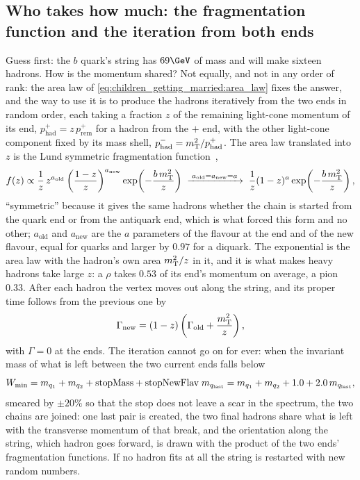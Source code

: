 \subsection{Who takes how much: the fragmentation function and the iteration from both ends}
\label{sec:children_getting_married:fragmentation_function}

Guess first: the $b$ quark's string has $69\GeV$ of mass and will make
sixteen hadrons. How is the momentum shared? Not equally, and not in any
order of rank: the area law of \cref{eq:children_getting_married:area_law}
fixes the answer, and the way to use it is to produce the hadrons
iteratively from the two ends in random order, each taking a fraction $z$
of the remaining light-cone momentum of its end,
$p^+_{\mathrm{had}}=z\,p^+_{\mathrm{rem}}$ for a hadron from the $+$ end,
with the other light-cone component fixed by its mass shell,
$p^-_{\mathrm{had}}=m_{\mathrm{T}}^2/p^+_{\mathrm{had}}$. The area law translated
into $z$ is the Lund symmetric fragmentation
function~\cite{Andersson:1983jt},
\begin{equation}
  f(z)\propto\frac{1}{z}\,z^{a_{\mathrm{old}}}\left(\frac{1-z}{z}\right)^{a_{\mathrm{new}}}
  \exp\!\left(-\frac{b\,m_{\mathrm{T}}^2}{z}\right)
  \;\xrightarrow{\;a_{\mathrm{old}}=a_{\mathrm{new}}=a\;}\;
  \frac{1}{z}(1-z)^a\exp\!\left(-\frac{b\,m_{\mathrm{T}}^2}{z}\right),
  \label{eq:children_getting_married:lund}
\end{equation}
``symmetric'' because it gives the same hadrons whether the chain is
started from the quark end or from the antiquark end, which is what forced
this form and no other; $a_{\mathrm{old}}$ and $a_{\mathrm{new}}$ are the
$a$ parameters of the flavour at the end and of the new flavour, equal for
quarks and larger by $0.97$ for a diquark. The exponential is the area law
with the hadron's own area $m_{\mathrm{T}}^2/z$ in it, and it is what makes heavy
hadrons take large $z$: a $\rho$ takes $0.53$ of its end's momentum on
average, a pion $0.33$. After each hadron the vertex moves out along the
string, and its proper time follows from the previous one by
\begin{equation}
  \Gamma_{\mathrm{new}}=(1-z)\left(\Gamma_{\mathrm{old}}+\frac{m_{\mathrm{T}}^2}{z}\right),
  \label{eq:children_getting_married:gamma_step}
\end{equation}
with $\Gamma=0$ at the ends. The iteration cannot go on for ever: when the
invariant mass of what is left between the two current ends falls below
\begin{equation}
  W_{\min}=m_{q_1}+m_{q_2}+\mathrm{stopMass}+\mathrm{stopNewFlav}\;m_{q_{\mathrm{last}}}
  =m_{q_1}+m_{q_2}+1.0+2.0\,m_{q_{\mathrm{last}}},
  \label{eq:children_getting_married:wmin}
\end{equation}
smeared by $\pm20\%$ so that the stop does not leave a scar in the
spectrum, the two chains are joined: one last pair is created, the two
final hadrons share what is left with the transverse momentum of that
break, and the orientation along the string, which hadron goes forward, is
drawn with the product of the two ends' fragmentation functions. If no
hadron fits at all the string is restarted with new random numbers.

